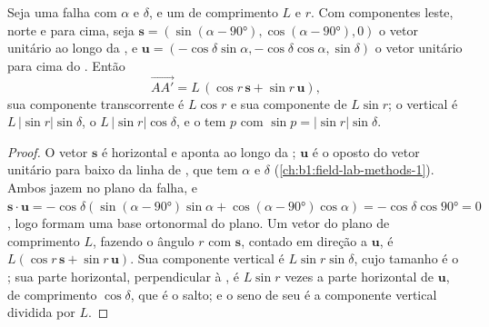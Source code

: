 \begin{proposition}\label{prop:b1:faults-folds-fabrics:slip-components}
Seja uma falha com  $\alpha$ e  $\delta$, e um  de comprimento $L$ e  $r$. Com componentes leste, norte e para cima, seja
$\mathbf s = (\sin(\alpha-\ang{90}), \cos(\alpha-\ang{90}), 0)$ o vetor unitário ao longo da , e $\mathbf u = (-\cos\delta\sin\alpha,
-\cos\delta\cos\alpha, \sin\delta)$ o vetor unitário para cima do . Então
\[
  \overrightarrow{AA'} = L\,(\cos r\,\mathbf s + \sin r\,\mathbf u),
\]
sua componente transcorrente é $L\cos r$ e sua componente de  $L\sin r$; o  vertical é $L\,|\sin r|\sin\delta$, o  $L\,|\sin r|\cos\delta$, e o  tem  $p$ com $\sin p = |\sin r|\sin\delta$.
\end{proposition}

\begin{proof}
O vetor $\mathbf s$ é horizontal e aponta ao longo da ; $\mathbf u$
é o oposto do vetor unitário para baixo da linha de , que tem 
$\alpha$ e  $\delta$ (\cref{ch:b1:field-lab-methods-1}). Ambos jazem no plano da falha, e $\mathbf s\cdot\mathbf u = -\cos\delta(\sin(\alpha -
\ang{90})\sin\alpha + \cos(\alpha - \ang{90})\cos\alpha) = -\cos\delta\cos\ang{90} = 0$, logo formam uma base ortonormal do plano. Um vetor do plano de comprimento $L$, fazendo o ângulo $r$ com $\mathbf s$, contado em direção a $\mathbf u$, é
$L(\cos r\,\mathbf s + \sin r\,\mathbf u)$. Sua componente vertical é
$L\sin r\sin\delta$, cujo tamanho é o ; sua parte horizontal, perpendicular à , é $L\sin r$ vezes a parte horizontal de $\mathbf u$, de comprimento
$\cos\delta$, que é o salto; e o seno de seu  é a componente vertical dividida por $L$.
\end{proof}

